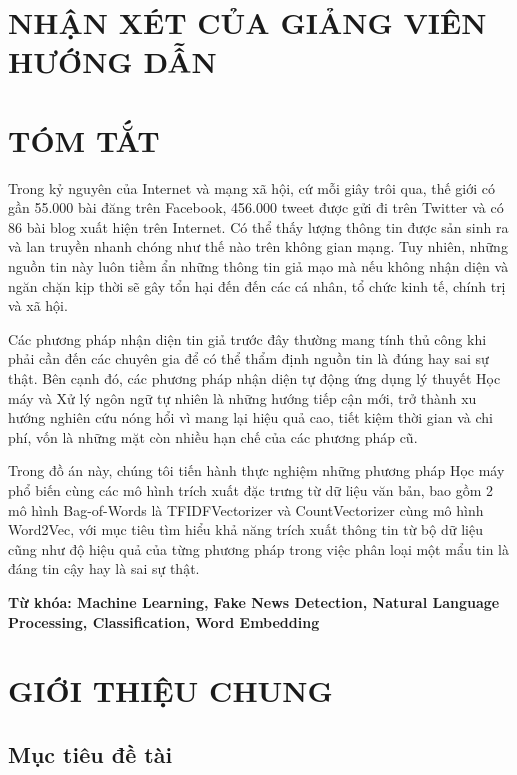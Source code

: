\documentclass[12pt,a4paper,oneside]{book}
\begin{document}
\chapter*{NHẬN XÉT CỦA GIẢNG VIÊN HƯỚNG DẪN}
	
\chapter*{TÓM TẮT}

	Trong kỷ nguyên của Internet và mạng xã hội, cứ mỗi giây trôi qua, thế giới có gần 55.000 bài đăng trên Facebook, 456.000 tweet được gửi đi trên Twitter và có 86 bài blog xuất hiện trên Internet. Có thể thấy lượng thông tin được sản sinh ra và lan truyền nhanh chóng như thế nào trên không gian mạng. Tuy nhiên, những nguồn tin này luôn tiềm ẩn những thông tin giả mạo mà nếu không nhận diện và ngăn chặn kịp thời sẽ gây tổn hại đến đến các cá nhân, tổ chức kinh tế, chính trị và xã hội. 


	Các phương pháp nhận diện tin giả trước đây thường mang tính thủ công khi phải cần đến các chuyên gia để có thể thẩm định nguồn tin là đúng hay sai sự thật. Bên cạnh đó, các phương pháp nhận diện tự động ứng dụng lý thuyết Học máy và Xử lý ngôn ngữ tự nhiên là những hướng tiếp cận mới, trở thành xu hướng nghiên cứu nóng hổi vì mang lại hiệu quả cao, tiết kiệm thời gian và chi phí, vốn là những mặt còn nhiều hạn chế của các phương pháp cũ.


	Trong đồ án này, chúng tôi tiến hành thực nghiệm những phương pháp Học máy phổ biến cùng các mô hình trích xuất đặc trưng từ dữ liệu văn bản, bao gồm 2 mô hình Bag-of-Words là TFIDFVectorizer và CountVectorizer cùng mô hình Word2Vec, với mục tiêu tìm hiểu khả năng trích xuất thông tin từ bộ dữ liệu cũng như độ hiệu quả của từng phương pháp trong việc phân loại một mẩu tin là đáng tin cậy hay là sai sự thật.

	\vspace{0.5cm}
	\textbf{Từ khóa: Machine Learning, Fake News Detection, Natural Language Processing, Classification, Word Embedding}
	\pagebreak
	
\chapter{GIỚI THIỆU CHUNG}

	\section{Mục tiêu đề tài}
	
\end{document}
